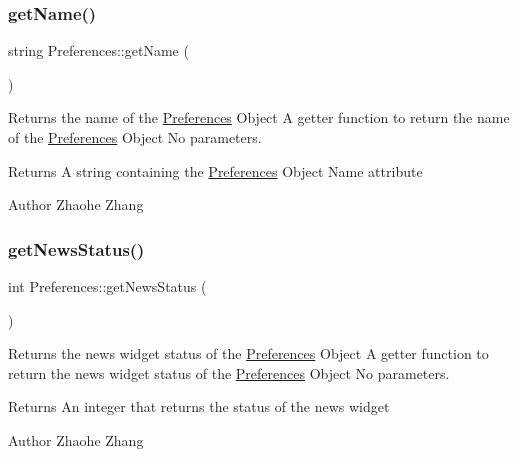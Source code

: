 \subsubsection{\texorpdfstring{get\+Name()}{getName()}}
{\footnotesize\ttfamily string Preferences\+::get\+Name (\begin{DoxyParamCaption}{ }\end{DoxyParamCaption})}



Returns the name of the \mbox{\hyperlink{class_preferences}{Preferences}} Object  A getter function to return the name of the \mbox{\hyperlink{class_preferences}{Preferences}} Object  No parameters. 

\begin{DoxyReturn}{Returns}
A string containing the \mbox{\hyperlink{class_preferences}{Preferences}} Object Name attribute 
\end{DoxyReturn}
\begin{DoxyAuthor}{Author}
Zhaohe Zhang 
\end{DoxyAuthor}
\mbox{\label{class_preferences_a6c9f2c89fa3de8956120d3a4eddb8e20}} 
\subsubsection{\texorpdfstring{get\+News\+Status()}{getNewsStatus()}}
{\footnotesize\ttfamily int Preferences\+::get\+News\+Status (\begin{DoxyParamCaption}{ }\end{DoxyParamCaption})}



Returns the news widget status of the \mbox{\hyperlink{class_preferences}{Preferences}} Object  A getter function to return the news widget status of the \mbox{\hyperlink{class_preferences}{Preferences}} Object  No parameters. 

\begin{DoxyReturn}{Returns}
An integer that returns the status of the news widget 
\end{DoxyReturn}
\begin{DoxyAuthor}{Author}
Zhaohe Zhang 
\end{DoxyAuthor}
\mbox{\label{class_preferences_a383d16a7105233f96b089403ddcfbd1c}} 
